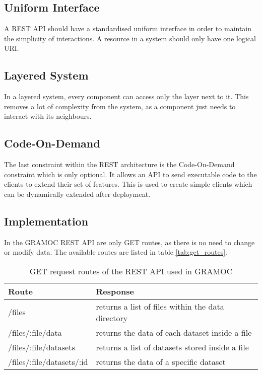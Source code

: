 \subsection{Uniform Interface}
A REST API should have a standardised uniform interface in order to maintain the simplicity of interactions. A resource in a system should only have one logical URI.

\subsection{Layered System}
In a layered system, every component can access only the layer next to it. This removes a lot of complexity from the system, as a component just needs to interact with its neighbours.

\subsection{Code-On-Demand}
The last constraint within the REST architecture is the Code-On-Demand constraint which is only optional. It allows an API to send executable code to the clients to extend their set of features. This is used to create simple clients which can be dynamically extended after deployment.

\subsection{Implementation}
In the GRAMOC REST API are only GET routes, as there is no need to change or modify data. The available routes are listed in table \vref{tab:get_routes}.

\begin{table}[H]
    \centering
    \begin{tabular}{| l | l |}
    \hline
    \textbf{Route} & \textbf{Response} \\ \hline
    /files & returns a list of files within the data directory \\ \hline
    /files/:file/data & returns the data of each dataset inside a file \\ \hline
    /files/:file/datasets & returns a list of datasets stored inside a file \\ \hline
    /files/:file/datasets/:id & returns the data of a specific dataset \\
    \hline
    \end{tabular}
    \caption{GET request routes of the REST API used in GRAMOC}
    \label{tab:get_routes}
\end{table}

